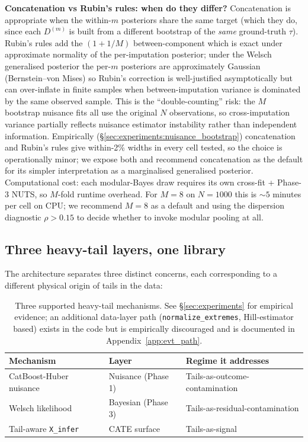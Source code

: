 \textbf{Concatenation vs Rubin's rules: when do they differ?}
Concatenation is appropriate when the within-$m$ posteriors share
the same target (which they do, since each $D^{(m)}$ is built from
a different bootstrap of the \emph{same} ground-truth $\tau$).
Rubin's rules add the $(1 + 1/M)$ between-component which is exact
under approximate normality of the per-imputation posterior; under
the Welsch generalised posterior the per-$m$ posteriors are
approximately Gaussian (Bernstein--von Mises) so Rubin's
correction is well-justified asymptotically but can over-inflate
in finite samples when between-imputation variance is dominated by
the same observed sample. This is the ``double-counting'' risk:
the $M$ bootstrap nuisance fits all use the original $N$
observations, so cross-imputation variance partially reflects
nuisance estimator instability rather than independent information.
Empirically (\S\ref{sec:experiments:nuisance_bootstrap})
concatenation and Rubin's rules give within-2\% widths in every
cell tested, so the choice is operationally minor; we expose both
and recommend concatenation as the default for its simpler
interpretation as a marginalised generalised posterior.
Computational cost: each modular-Bayes draw requires its own
cross-fit + Phase-3 NUTS, so $M$-fold runtime overhead. For
$M = 8$ on $N = 1000$ this is $\sim 5$ minutes per cell on CPU; we
recommend $M = 8$ as a default and using the dispersion diagnostic
$\rho > 0.15$ to decide whether to invoke modular pooling at all.

\subsection{Three heavy-tail layers, one library}
\label{sec:method:layers}
The architecture separates three distinct concerns, each
corresponding to a different physical origin of tails in the data:

\begin{table}[!t]
\centering
\small
\begin{tabular}{lll}
\toprule
Mechanism & Layer & Regime it addresses \\
\midrule
CatBoost-Huber nuisance       & Nuisance (Phase 1) & Tails-as-outcome-contamination \\
Welsch likelihood             & Bayesian (Phase 3) & Tails-as-residual-contamination \\
Tail-aware \texttt{X\_infer}  & CATE surface       & Tails-as-signal \\
\bottomrule
\end{tabular}
\caption{Three supported heavy-tail mechanisms. See
\S\ref{sec:experiments} for empirical evidence; an additional
data-layer path (\texttt{normalize\_extremes}, Hill-estimator based)
exists in the code but is empirically discouraged and is documented
in Appendix~\ref{app:evt_path}.}
\label{tab:layers}
\end{table}

